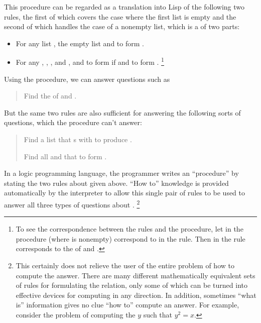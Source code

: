 This procedure can be regarded as a translation into Lisp of the following two rules, the first of which covers the case where the first list is empty and the second of which handles the case of a nonempty list, which is a  of two parts:
\begin{itemize}

	\item
		For any list , the empty list and   to form .

	\item
		For any , , , and ,  and   to form  if  and   to form .%
		\footnote{
			To see the correspondence between the rules and the procedure, let  in the procedure (where  is nonempty) correspond to  in the rule.
			Then  in the rule corresponds to the  of  and .
		}

\end{itemize}
Using the  procedure, we can answer questions such as
\begin{quote}
	Find the  of  and .
\end{quote}
But the same two rules are also sufficient for answering the following sorts of questions, which the procedure can’t answer:
\begin{quote}
	Find a list  that s with  to produce .

	Find all  and  that  to form .
\end{quote}

In a logic programming language, the programmer writes an  “procedure” by stating the two rules about  given above.
“How to” knowledge is provided automatically by the interpreter to allow this single pair of rules to be used to answer all three types of questions about .%
\footnote{
	This certainly does not relieve the user of the entire problem of how to compute the answer.
	There are many different mathematically equivalent sets of rules for formulating the  relation, only some of which can be turned into effective devices for computing in any direction.
	In addition, sometimes “what is”  information gives no clue  “how to” compute an answer.
	For example, consider the problem of computing the \( y \) such that \( y^2 = x \).
}

